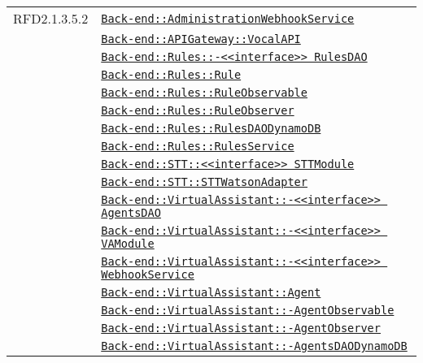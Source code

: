 \begin{longtable}{|>{\centering}m{3cm}|m{10cm}<{\centering}|}
RFD2.1.3.5.2 & \hyperref[Back-end::AdministrationWebhookService]{\texttt{Back-end::AdministrationWebhookService}}\\
& \hyperref[Back-end::APIGateway::VocalAPI]{\texttt{Back-end::APIGateway::VocalAPI}}\\
& \hyperref[Back-end::Rules::<<interface>> RulesDAO]{\texttt{Back-end::Rules::-\linebreak <<interface>> RulesDAO}}\\
& \hyperref[Back-end::Rules::Rule]{\texttt{Back-end::Rules::Rule}}\\
& \hyperref[Back-end::Rules::RuleObservable]{\texttt{Back-end::Rules::RuleObservable}}\\
& \hyperref[Back-end::Rules::RuleObserver]{\texttt{Back-end::Rules::RuleObserver}}\\
& \hyperref[Back-end::Rules::RulesDAODynamoDB]{\texttt{Back-end::Rules::RulesDAODynamoDB}}\\
& \hyperref[Back-end::Rules::RulesService]{\texttt{Back-end::Rules::RulesService}}\\
& \hyperref[Back-end::STT::<<interface>> STTModule]{\texttt{Back-end::STT::<<interface>> STTModule}}\\
& \hyperref[Back-end::STT::STTWatsonAdapter]{\texttt{Back-end::STT::STTWatsonAdapter}}\\
& \hyperref[Back-end::VirtualAssistant::<<interface>> AgentsDAO]{\texttt{Back-end::VirtualAssistant::-\linebreak <<interface>> AgentsDAO}}\\
& \hyperref[Back-end::VirtualAssistant::<<interface>> VAModule]{\texttt{Back-end::VirtualAssistant::-\linebreak <<interface>> VAModule}}\\
& \hyperref[Back-end::VirtualAssistant::<<interface>> WebhookService]{\texttt{Back-end::VirtualAssistant::-\linebreak <<interface>> WebhookService}}\\
& \hyperref[Back-end::VirtualAssistant::Agent]{\texttt{Back-end::VirtualAssistant::Agent}}\\
& \hyperref[Back-end::VirtualAssistant::AgentObservable]{\texttt{Back-end::VirtualAssistant::-\linebreak AgentObservable}}\\
& \hyperref[Back-end::VirtualAssistant::AgentObserver]{\texttt{Back-end::VirtualAssistant::-\linebreak AgentObserver}}\\
& \hyperref[Back-end::VirtualAssistant::AgentsDAODynamoDB]{\texttt{Back-end::VirtualAssistant::-\linebreak AgentsDAODynamoDB}}\\

\end{longtable}

